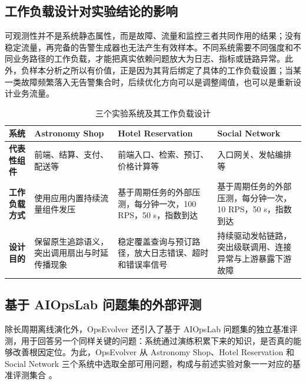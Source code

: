 \subsection{工作负载设计对实验结论的影响}

可观测性并不是系统静态属性，而是故障、流量和监控三者共同作用的结果；没有稳定流量，再完备的告警生成器也无法产生有效样本。不同系统需要不同强度和不同业务路径的工作负载，才能把真实依赖问题放大为日志、指标或链路异常。此外，负样本分析之所以有价值，正是因为其背后绑定了具体的工作负载设置；当某一类故障频繁落入无告警集合时，后续优化方向可以是调整阈值，也可以是重新设计业务流量。

\begin{table}[htbp]
    \centering
    \caption{三个实验系统及其工作负载设计}
    \label{tab:benchmark-workload-transposed}
    \small
    \begin{tabular}{>{\centering\arraybackslash}m{1.3cm}>{\centering\arraybackslash}m{3.9cm}>{\centering\arraybackslash}m{3.9cm}>{\centering\arraybackslash}m{3.9cm}}
        \toprule
        \textbf{系统} & \textbf{Astronomy Shop} & \textbf{Hotel Reservation} & \textbf{Social Network} \\
        \midrule
        \textbf{代表性组件} & 前端、结算、支付、配送等 & 前端入口、检索、预订、价格计算等 & 入口网关、发帖编排等 \\
        \textbf{工作负载方式} & 使用应用内置持续流量组件发压 & 基于周期任务的外部压测，每分钟一次，100 RPS，50 s，指数到达 & 基于周期任务的外部压测，每分钟一次，10 RPS，50 s，指数到达 \\
        \textbf{设计目的} & 保留原生追踪语义，突出调用扇出与时延传播现象 & 稳定覆盖查询与预订路径，放大日志错误、超时和错误率信号 & 持续驱动发帖链路，突出级联调用、连接异常与上游暴露下游故障 \\
        \bottomrule
    \end{tabular}
\end{table}

\subsection{基于 AIOpsLab 问题集的外部评测}

除长周期离线演化外，OpsEvolver 还引入了基于 AIOpsLab 问题集的独立基准评测，用于回答另一个同样关键的问题：系统通过演练积累下来的知识，是否真的能够改善根因定位。为此，OpsEvolver 从 Astronomy Shop、Hotel Reservation 和 Social Network 三个系统中选取全部可用问题，构成与前述实验对象一一对应的基准评测集合 \cite{chen2025aiopslab}。

